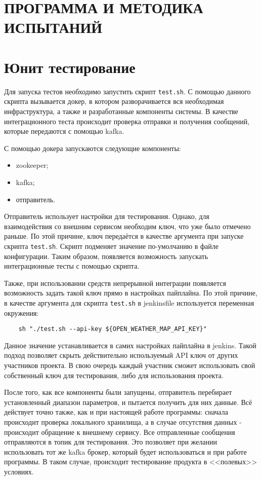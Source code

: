 \pagebreak
\section{ПРОГРАММА И МЕТОДИКА ИСПЫТАНИЙ}
\label{sec:testing}

\section{Юнит тестирование}

Для запуска тестов необходимо запустить скрипт \texttt{test.sh}.
С помощью данного скрипта вызывается докер, в котором разворачивается вся необходимая инфраструктура, а также и разработанные компоненты системы.
В качестве интеграционного теста происходит проверка отправки и получения сообщений, которые передаются с помощью kafka.

С помощью докера запускаются следующие компоненты:
\begin{itemize}
    \item zookeeper;
    \item kafka;
    \item отправитель.
\end{itemize}

Отправитель использует настройки для тестирования.
Однако, для взаимодействия со внешним сервисом необходим ключ, что уже было отмечено раньше.
По этой причине, ключ передаётся в качестве аргумента при запуске скрипта \texttt{test.sh}.
Скрипт подменяет значение по-умолчанию в файле конфигурации.
Таким образом, появляется возможность запускать интеграционные тесты с помощью скрипта.

Также, при использовании средств непрерывной интеграции появляется возможность задать такой ключ прямо в настройках пайплайна.
По этой причине, в качестве аргумента для скрипта \texttt{test.sh} в jenkinsfile используется переменная окружения:
\begin{lstlisting}
    sh "./test.sh --api-key ${OPEN_WEATHER_MAP_API_KEY}"
\end{lstlisting}

Данное значение устанавливается в самих настройках пайплайна в jenkins.
Такой подход позволяет скрыть действительно используемый API ключ от других участников проекта.
В свою очередь каждый участник сможет использовать свой собственный ключ для тестирования, либо для использования проекта.

После того, как все компоненты были запущены, отправитель перебирает установленный диапазон параметров, и пытается получить для них данные.
Всё действует точно также, как и при настоящей работе программы: сначала происходит проверка локального хранилища, а в случае отсутствия данных - происходит обращение к внешнему сервису.
Все отправленные сообщения отправляются в топик для тестирования.
Это позволяет при желании использовать тот же kafka брокер, который будет использоваться и при работе программы.
В таком случае, происходит тестирование продукта в <<полевых>> условиях.

